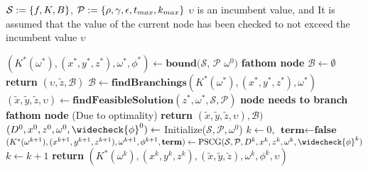 \begin{algorithm}[H]
\begin{algorithmic}
 \State \quad\quad$\mathcal{S}:=\left\{ f,K,B \right \}$, $\mathcal{P}:=\left\{ \rho,\gamma, \epsilon, t_{max}, k_{max} \right \}$
 \State \quad\quad$\upsilon$ is an incumbent value, and 
 \State \quad\quad It is assumed that the value of the current node has been checked to not exceed the incumbent value $\upsilon$ 
\end{algorithmic}
\begin{algorithmic}
  \State $\left(K^{*}(\omega^*),(x^{*},y^*,z^{*}),\omega^{*},{\phi}^{*}\right) \gets \textbf{bound}(\mathcal{S}$, $\mathcal{P}$ $\omega^0)$
{}
 \State \textbf{fathom node}
 \State $\mathcal{B} \gets \emptyset$
 \State \textbf{return} $(\upsilon, \widetilde{z}, \mathcal{B})$
\EndIf
\State $\mathcal{B} \gets \textbf{findBranchings}(K^{*}(\omega^*),(x^{*},y^*,z^{*}),\omega^{*})$
\State $(\widetilde{x},\widetilde{y},\widetilde{z},\upsilon) \gets \textbf{findFeasibleSolution}(z^{*},\omega^{*},\mathcal{S},\mathcal{P})$ %
\State \textbf{node needs to branch}
\Else
\State \textbf{fathom node}  (Due to optimality)
\EndIf
\State \textbf{return} $(\widetilde{x},\widetilde{y},\widetilde{z},\upsilon), \mathcal{B})$
\EndFunction
{}
\State $(D^0,x^0,z^0,\omega^0,\widecheck{\phi}^0) \gets$ Initialize($\mathcal{S},\mathcal{P},\omega^0$)
\State $k \gets 0$, $\textbf{term}\gets\textbf{false}$
 \State $(K^*(\omega^{k+1}), (x^{k+1},y^{k+1},z^{k+1}),\omega^{k+1},{\phi}^{k+1}, \textbf{term}) \gets \text{PSCG}(\mathcal{S},\mathcal{P},D^k,x^k,z^k,\omega^k,\widecheck{\phi}^k)$
 \State $k \gets k+1$
\EndWhile
\State \textbf{return} $\left(K^*(\omega^{k}), (x^{k},y^{k},z^{k}),(\widetilde{x},\widetilde{y},\widetilde{z}),\omega^{k},{\phi}^{k},\upsilon\right)$
\EndFunction
\end{algorithmic}
\end{algorithm}



